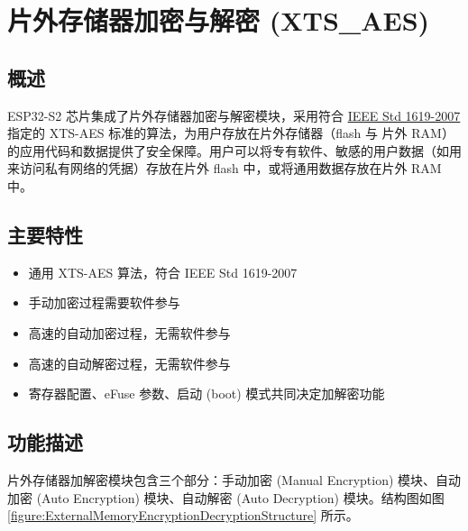 \documentclass[main\_\_CN.tex]{subfiles}
\begin{document}

\ifglobal
\else
    {\let\clearpage\relax \listoftodos}
    {\let\clearpage\relax \listofdonetodos}
    \tableofcontents
\fi



\chapter{片外存储器加密与解密 (XTS\_AES)}
\label{mod:extmemencr}
\hypertarget{extmemencr}{}


\section{概述}

ESP32-S2 芯片集成了片外存储器加密与解密模块，采用符合 \href{https://ieeexplore.ieee.org/document/4493450}{IEEE Std 1619-2007} 指定的 XTS-AES 标准的算法，为用户存放在片外存储器（flash 与 片外 RAM）的应用代码和数据提供了安全保障。用户可以将专有软件、敏感的用户数据（如用来访问私有网络的凭据）存放在片外 flash 中，或将通用数据存放在片外 RAM 中。


\section{主要特性}

\begin{itemize}
    \item 通用 XTS-AES 算法，符合 IEEE Std 1619-2007
    \item 手动加密过程需要软件参与
    \item 高速的自动加密过程，无需软件参与
    \item 高速的自动解密过程，无需软件参与
    \item 寄存器配置、eFuse 参数、启动 (boot) 模式共同决定加解密功能
\end{itemize}


\section{功能描述}
片外存储器加解密模块包含三个部分：手动加密 (Manual Encryption) 模块、自动加密 (Auto Encryption) 模块、自动解密 (Auto Decryption) 模块。结构图如图 \ref{figure:ExternalMemoryEncryptionDecryptionStructure} 所示。
\end{document}
